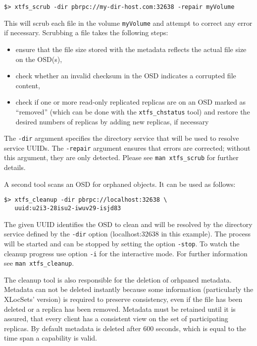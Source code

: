 \documentclass[a4paper,10pt]{book}
\begin{document}
\begin{verbatim}
$> xtfs_scrub -dir pbrpc://my-dir-host.com:32638 -repair myVolume
\end{verbatim}

This will scrub each file in the volume \texttt{myVolume} and attempt to correct any error if necessary. Scrubbing a file takes the following steps:
\begin{itemize}
 \item ensure that the file size stored with the metadata reflects the actual file size on the OSD(s),
 \item check whether an invalid checksum in the OSD indicates a corrupted file content,
 \item check if one or more read-only replicated replicas are on an OSD marked as ``removed'' (which can be done with the \texttt{xtfs\_chstatus} tool) and restore the desired numbers of replicas by adding new replicas, if necessary
\end{itemize}

The \texttt{-dir} argument specifies the directory service that will be used to resolve service UUIDs. The \texttt{-repair} argument ensures that errors are corrected; without this argument, they are only detected. Please see \texttt{man xtfs\_scrub} for further details.

A second tool scans an OSD for orphaned objects. It can be used as follows:

\begin{verbatim}
$> xtfs_cleanup -dir pbrpc://localhost:32638 \
   uuid:u2i3-28isu2-iwuv29-isjd83
\end{verbatim}
The given UUID identifies the OSD to clean and will be resolved by the
directory service defined by the \texttt{-dir} option (localhost:32638 in this example).
The process will be started and can be stopped by setting the option
\texttt{-stop}. To watch the cleanup progress use option \texttt{-i} for the
interactive mode. For further information see \texttt{man xtfs\_cleanup}.

The cleanup tool is also responsible for the deletion of orhpaned metadata. Metadata can
not be deleted instantly because some information (particularly the XLocSets' version) is
required to preserve consistency, even if the file has been deleted or a replica has been
removed. Metadata must be retained until it is assured, that every client has a consistent
view on the set of participating replicas. By default metadata is deleted after 600 seconds,
which is equal to the time span a capability is valid.
\end{document}
